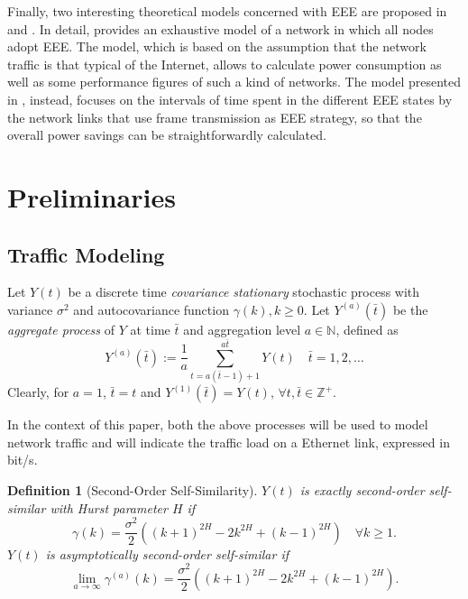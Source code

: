 \documentclass[journal,10pt,twoside,final]{IEEEtran}
\newtheorem{definition}{Definition}
\begin{document}
Finally, two interesting theoretical models concerned with EEE are proposed in \cite{bolla_jsac} and \cite{marsan_cl}. In detail, \cite{bolla_jsac} provides an exhaustive model of a network in which all nodes adopt EEE. The model, which is based on the assumption that the network traffic is that typical of the Internet, allows to calculate power consumption as well as some performance figures of such a kind of networks. The model presented in \cite{marsan_cl}, instead, focuses on the intervals of time spent in the different EEE states by the network links that use frame transmission as EEE strategy, so that the overall power savings can be straightforwardly calculated. 

\section{Preliminaries}
\label{sec:preliminaries}
\subsection{Traffic Modeling}

Let $Y(t)$ be a discrete time \textit{covariance stationary} stochastic process with variance $\sigma ^2$ and autocovariance function $\gamma(k), k\geq 0$. Let $Y^{(a)}(\bar t)$ be the \textit{aggregate process} of $Y$ at time $\bar t$ and aggregation level $a\in\mathbb{N}$, defined as
\begin{equation*}
Y^{(a)}(\bar t) := \frac{1}{a} \sum_{t = a(\bar t-1)+1}^{a\bar t} Y(t)\quad \bar t=1,2,\dots 
\end{equation*}
Clearly, for $a=1$, $\bar t=t$ and $Y^{(1)}(\bar t)=Y(t)$, $\forall t, \bar t \in \mathbb{Z^+}$.

In the context of this paper, both the above processes will be used to model network traffic and will indicate the traffic load on a Ethernet link, expressed in bit/s. 
\begin{definition}[Second-Order Self-Similarity] 
$Y(t)$ is exactly second-order self-similar with Hurst parameter $H$ if
\begin{equation}
\gamma(k) = \frac{\sigma ^2}{2} \left(\left(k+1\right)^{2H} - 2k^{2H} + \left(k-1\right)^{2H}\right) \quad \forall k\geq 1.
\label{eq1}
\end{equation}  
$Y(t)$ is asymptotically second-order self-similar if
\begin{equation}
\lim_{a \to \infty}\gamma^{(a)}(k) = \frac{\sigma ^2}{2} \left(\left(k+1\right)^{2H} - 2k^{2H} + \left(k-1\right)^{2H}\right).
\end{equation}
\end{definition}
\end{document}
